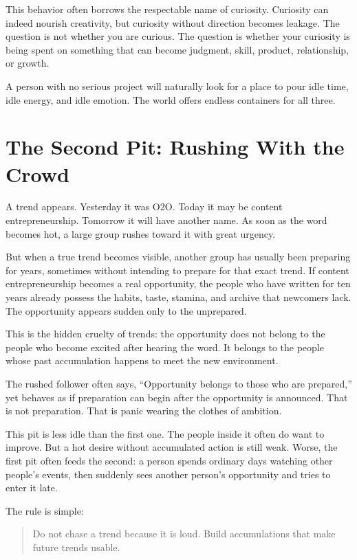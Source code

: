This behavior often borrows the respectable name of curiosity. Curiosity can indeed nourish creativity, but curiosity without direction becomes leakage. The question is not whether you are curious. The question is whether your curiosity is being spent on something that can become judgment, skill, product, relationship, or growth.

A person with no serious project will naturally look for a place to pour idle time, idle energy, and idle emotion. The world offers endless containers for all three.

\section*{The Second Pit: Rushing With the Crowd}

A trend appears. Yesterday it was O2O. Today it may be content entrepreneurship. Tomorrow it will have another name. As soon as the word becomes hot, a large group rushes toward it with great urgency.

But when a true trend becomes visible, another group has usually been preparing for years, sometimes without intending to prepare for that exact trend. If content entrepreneurship becomes a real opportunity, the people who have written for ten years already possess the habits, taste, stamina, and archive that newcomers lack. The opportunity appears sudden only to the unprepared.

This is the hidden cruelty of trends: the opportunity does not belong to the people who become excited after hearing the word. It belongs to the people whose past accumulation happens to meet the new environment.

The rushed follower often says, ``Opportunity belongs to those who are prepared,'' yet behaves as if preparation can begin after the opportunity is announced. That is not preparation. That is panic wearing the clothes of ambition.

This pit is less idle than the first one. The people inside it often do want to improve. But a hot desire without accumulated action is still weak. Worse, the first pit often feeds the second: a person spends ordinary days watching other people's events, then suddenly sees another person's opportunity and tries to enter it late.

The rule is simple:

\begin{quote}
Do not chase a trend because it is loud. Build accumulations that make future trends usable.
\end{quote}

